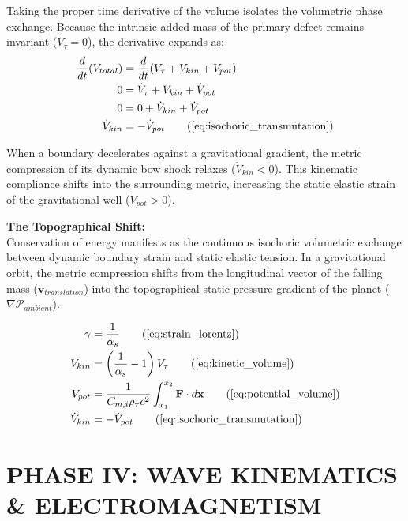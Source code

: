 Taking the proper time derivative of the volume isolates the volumetric phase exchange. Because the intrinsic added mass of the primary defect remains invariant ($\dot{V}_\tau = 0$), the derivative expands as:
\begin{align}
    \frac{d}{dt}(V_{total}) &= \frac{d}{dt}(V_\tau + V_{kin} + V_{pot}) \nonumber \\
    0 &= \dot{V}_\tau + \dot{V}_{kin} + \dot{V}_{pot} \nonumber \\
    0 &= 0 + \dot{V}_{kin} + \dot{V}_{pot} \nonumber \\
    \dot{V}_{kin} &= -\dot{V}_{pot} \tag{\ref{eq:isochoric_transmutation}}
\end{align}

When a boundary decelerates against a gravitational gradient, the metric compression of its dynamic bow shock relaxes ($\dot{V}_{kin} < 0$). This kinematic compliance shifts into the surrounding metric, increasing the static elastic strain of the gravitational well ($\dot{V}_{pot} > 0$).

\textbf{The Topographical Shift:} \\
Conservation of energy manifests as the continuous isochoric volumetric exchange between dynamic boundary strain and static elastic tension. In a gravitational orbit, the metric compression shifts from the longitudinal vector of the falling mass ($\mathbf{v}_{translation}$) into the topographical static pressure gradient of the planet ($\nabla \mathcal{P}_{ambient}$).

\begin{tcolorbox}[recallbox, title={\ref{box:volumetric_energy}. Kinetic-Potential Strain Conservation}]
\begin{align}
    \gamma &= \frac{1}{\alpha_s} \tag{\ref{eq:strain_lorentz}} \\
    V_{kin} &= \left( \frac{1}{\alpha_s} - 1 \right) V_\tau \tag{\ref{eq:kinetic_volume}} \\
    V_{pot} &= \frac{1}{C_{m,i}\rho_{\tau} c^2} \int_{x_1}^{x_2} \mathbf{F} \cdot d\mathbf{x} \tag{\ref{eq:potential_volume}} \\
    \dot{V}_{kin} &= -\dot{V}_{pot} \tag{\ref{eq:isochoric_transmutation}}
\end{align}
\end{tcolorbox}



\newpage

\part*{PHASE IV: WAVE KINEMATICS \& ELECTROMAGNETISM}


